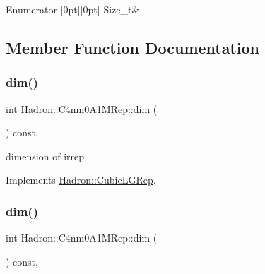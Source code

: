 \begin{DoxyEnumFields}{Enumerator}
[0pt][0pt]{}\mbox{\label{structHadron_1_1C4nm0A1MRep_ad530a608e4a7eaad1dd37e3373b24ec2af32e20645456aaf055c61effc372ef72}} 
Size\+\_\+t&\\
\hline

\end{DoxyEnumFields}


\subsection{Member Function Documentation}
\mbox{\label{structHadron_1_1C4nm0A1MRep_ae62b548a67faabb6850b1fc035815dc4}} 
\subsubsection{\texorpdfstring{dim()}{dim()}\hspace{0.1cm}{\footnotesize\ttfamily [1/3]}}
{\footnotesize\ttfamily int Hadron\+::\+C4nm0\+A1\+M\+Rep\+::dim (\begin{DoxyParamCaption}{ }\end{DoxyParamCaption}) const\hspace{0.3cm}{\ttfamily [inline]}, {\ttfamily [virtual]}}

dimension of irrep 

Implements \mbox{\hyperlink{structHadron_1_1CubicLGRep_a3acbaea26503ed64f20df693a48e4cdd}{Hadron\+::\+Cubic\+L\+G\+Rep}}.

\mbox{\label{structHadron_1_1C4nm0A1MRep_ae62b548a67faabb6850b1fc035815dc4}} 
\subsubsection{\texorpdfstring{dim()}{dim()}\hspace{0.1cm}{\footnotesize\ttfamily [2/3]}}
{\footnotesize\ttfamily int Hadron\+::\+C4nm0\+A1\+M\+Rep\+::dim (\begin{DoxyParamCaption}{ }\end{DoxyParamCaption}) const\hspace{0.3cm}{\ttfamily [inline]}, {\ttfamily [virtual]}}

